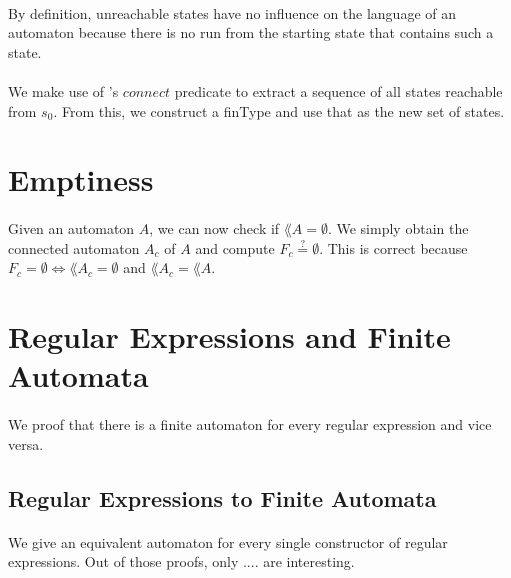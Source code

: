 \documentclass[11pt,a4paper,oneside]{book}
\begin{document}
            \paragraph{}
                By definition, unreachable states have no influence on the language of an automaton because there is no run from the starting state that contains such a state.

            \paragraph{}
                We make use of \ssreflect's $connect$ predicate to extract a sequence of all states reachable from $s_0$. 
                From this, we construct a finType and use that as the new set of states.


        \section{Emptiness}
            \paragraph{}
                Given an automaton $A$, we can now check if $\lang{A} = \emptyset$. We simply obtain the connected automaton $A_c$ of $A$ and compute $F_c \stackrel{?}{=} \emptyset$. This is correct because $F_c = \emptyset \Leftrightarrow \lang{A_c} = \emptyset$ and $\lang{A_c} = \lang{A}$.

        \section{Regular Expressions and Finite Automata}

            \paragraph{} 
                We proof that there is a finite automaton for every regular expression and vice versa. 

            \subsection{Regular Expressions to Finite Automata}

                \paragraph{} 
                    We give an equivalent automaton for every single constructor of regular expressions.
                    Out of those proofs, only .... are interesting.
\end{document}
